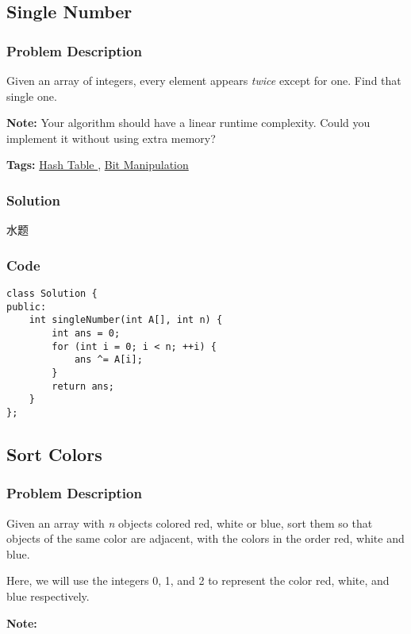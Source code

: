 \documentclass{article}
\begin{document}
\begin{CJK*}{UTF8}{gkai}
\subsection{ Single Number }
\label{ Single Number }

\subsubsection*{Problem Description}
Given an array of integers, every element appears \emph{twice} except for one. Find that single one.

\textbf{Note:}
Your algorithm should have a linear runtime complexity. Could you implement it without using extra memory?


\textbf{Tags: }
\hyperref[ Hash Table ]{ Hash Table },  \hyperref[ Bit Manipulation ]{ Bit Manipulation }



\subsubsection*{Solution}
水题

\subsubsection*{Code}
\begin{lstlisting}
class Solution {
public:
    int singleNumber(int A[], int n) {
        int ans = 0;
        for (int i = 0; i < n; ++i) {
            ans ^= A[i];
        }
        return ans;
    }
}; 
\end{lstlisting}


\subsection{ Sort Colors }
\label{ Sort Colors }

\subsubsection*{Problem Description}
Given an array with \emph{n} objects colored red, white or blue, sort them so that objects of the same color are adjacent, with the colors in the order red, white and blue.

Here, we will use the integers 0, 1, and 2 to represent the color red, white, and blue respectively.

\textbf{Note:}



\end{CJK*}
\end{document}
